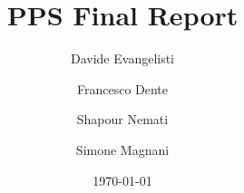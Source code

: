 \documentclass{scrartcl}
\title{\LARGE
    PPS Final Report
}
\author{
    Davide Evangelisti \\ \emailaddr{davide.evangelisti2@studio.unibo.it}
    \and 
    Francesco Dente \\ \emailaddr{francesco.dente@studio.unibo.it} 
    \and 
    Shapour Nemati \\ \emailaddr{shapour.nemati@studio.unibo.it}
    \and 
    Simone Magnani \\ \emailaddr{simone.magnani4@studio.unibo.it} 
    
}
\date{\today}
\begin{document}
\maketitle

\tableofcontents

\newpage















\nocite{*} %


\end{document}
